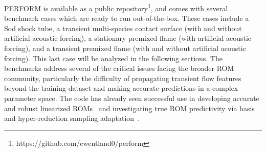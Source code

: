 PERFORM is available as a public repository\footnote{https://github.com/cwentland0/perform}, and comes with several benchmark cases which are ready to run out-of-the-box. These cases include a Sod shock tube, a transient multi-species contact surface (with and without artificial acoustic forcing), a stationary premixed flame (with artificial acoustic forcing), and a transient premixed flame (with and without artificial acoustic forcing). This last case will be analyzed in the following sections. The benchmarks address several of the critical issues facing the broader ROM community, particularly the difficulty of propagating transient flow features beyond the training dataset and making accurate predictions in a complex parameter space. The code has already seen successful use in developing accurate and robust linearized ROMs~\cite{Rezaian2022} and investigating true ROM predictivity via basis and hyper-reduction sampling adaptation~\cite{WayneIsaacTanUy2022}.